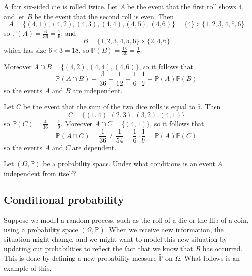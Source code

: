 \begin{example}
A fair six-sided die is rolled twice. Let $A$ be the event that the first roll shows $4$, and let $B$ be the event that the second roll is even. Then
\[ A = \{ (4,1), (4,2), (4,3), (4,4), (4,5), (4,6) \} = \{ 4 \} \times \{ 1, 2, 3, 4, 5, 6 \} \]
so $\mathbb{P}(A) = \frac{6}{36} = \frac{1}{6}$; and
\[ B = \{ 1, 2, 3, 4, 5, 6 \} \times \{ 2, 4, 6 \} \]
which has size $6 \times 3 = 18$, so $\mathbb{P}(B) = \frac{18}{36} = \frac{1}{2}$.

Moreover $A \cap B = \{ (4,2), (4,4), (4,6) \}$, so it follows that
\[ \mathbb{P}(A \cap B) = \frac{3}{36} = \frac{1}{12} = \frac{1}{6} \cdot \frac{1}{2} = \mathbb{P}(A)\mathbb{P}(B) \]
so the events $A$ and $B$ are independent.

Let $C$ be the event that the sum of the two dice rolls is equal to $5$. Then
\[ C = \{ (1,4), (2,3), (3,2), (4,1) \} \]
so $\mathbb{P}(C) = \frac{4}{36} = \frac{1}{9}$. Moreover $A \cap C = \{ (4, 1) \}$, so it follows that
\[ \mathbb{P}(A \cap C) = \frac{1}{36} \ne \frac{1}{54} = \frac{1}{6} \cdot \frac{1}{9} = \mathbb{P}(A)\mathbb{P}(C) \]
so the events $A$ and $C$ are dependent.
\end{example}

\begin{exercise}
Let $(\Omega,\mathbb{P})$ be a probability space. Under what conditions is an event $A$ independent from itself?
\end{exercise}

\subsection*{Conditional probability}

Suppose we model a random process, such as the roll of a die or the flip of a coin, using a probability space $(\Omega,\mathbb{P})$. When we receive new information, the situation might change, and we might want to model this new situation by updating our probabilities to reflect the fact that we know that $B$ has occurred. This is done by defining a new probability measure $\widetilde{\mathbb{P}}$ on $\Omega$. What follows is an example of this.

